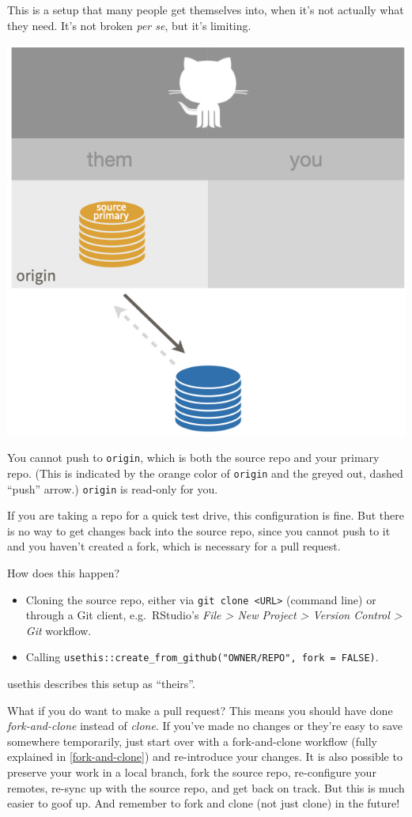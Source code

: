 \documentclass[
]{book}
\providecommand{\tightlist}{%
  \setlength{\itemsep}{0pt}\setlength{\parskip}{0pt}}
\begin{document}
This is a setup that many people get themselves into, when it's not actually what they need.
It's not broken \emph{per se}, but it's limiting.

\begin{center}\includegraphics[width=0.6\linewidth]{img/theirs} \end{center}

You cannot push to \texttt{origin}, which is both the source repo and your primary repo.
(This is indicated by the orange color of \texttt{origin} and the greyed out, dashed ``push'' arrow.)
\texttt{origin} is read-only for you.

If you are taking a repo for a quick test drive, this configuration is fine.
But there is no way to get changes back into the source repo, since you cannot push to it and you haven't created a fork, which is necessary for a pull request.

How does this happen?

\begin{itemize}
\tightlist
\item
  Cloning the source repo, either via \texttt{git\ clone\ \textless{}URL\textgreater{}} (command line) or through a Git client, e.g.~RStudio's \emph{File \textgreater{} New Project \textgreater{} Version Control \textgreater{} Git} workflow.
\item
  Calling \texttt{usethis::create\_from\_github("OWNER/REPO",\ fork\ =\ FALSE)}.
\end{itemize}

usethis describes this setup as ``theirs''.

What if you do want to make a pull request?
This means you should have done \emph{fork-and-clone} instead of \emph{clone}.
If you've made no changes or they're easy to save somewhere temporarily, just start over with a fork-and-clone workflow (fully explained in \ref{fork-and-clone}) and re-introduce your changes.
It is also possible to preserve your work in a local branch, fork the source repo, re-configure your remotes, re-sync up with the source repo, and get back on track.
But this is much easier to goof up.
And remember to fork and clone (not just clone) in the future!
\end{document}
